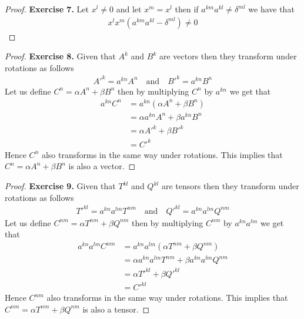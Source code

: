 \documentclass[11pt]{article}
\theoremstyle{definition}
\begin{document}
\begin{proof}{\textbf{Exercise 7.}}
    Let $x^l \neq 0$ and let $x^m = x^l$ then if $a^{km}a^{kl} \neq \delta^{ml}$
    we have that
    \begin{align*}
        x^lx^m(a^{km}a^{kl} - \delta^{ml}) \neq 0
    \end{align*}
\end{proof}
\begin{proof}{\textbf{Exercise 8.}}
    Given that $A^k$ and $B^k$ are vectors then they transform under rotations
    as follows
    \begin{align*}
        A'^k = a^{kn} A^n \quad\text{and}\quad B'^k = a^{kn} B^n
    \end{align*}
    Let us define $C^n = \alpha A^n + \beta B^n $
    then by multiplying $C^n$ by $a^{kn}$ we get that
    \begin{align*}
        a^{kn}C^n &= a^{kn}(\alpha A^n + \beta B^n)\\
            &= \alpha a^{kn} A^n + \beta a^{kn}B^n\\
            &= \alpha A'^k + \beta B'^k\\
            &= C'^k
    \end{align*}
    Hence $C^n$ also transforms in the same way under rotations.
    This implies that $C^n = \alpha A^n + \beta B^n$ is also a vector.
\end{proof}
\begin{proof}{\textbf{Exercise 9.}}
    Given that $T^{kl}$ and $Q^{kl}$ are tensors then they transform under
    rotations as follows
    \begin{align*}
        T'^{kl} = a^{kn}a^{lm} T^{nm} \quad\text{and}\quad
        Q'^{kl} = a^{kn}a^{lm} Q^{nm}
    \end{align*}
    Let us define $C^{nm} = \alpha T^{nm} + \beta Q^{nm} $
    then by multiplying $C^{nm}$ by $a^{kn}a^{lm}$ we get that
    \begin{align*}
        a^{kn}a^{lm}C^{nm} &= a^{kn}a^{lm}(\alpha T^{nm} + \beta Q^{nm})\\
            &= \alpha a^{kn}a^{lm} T^{nm} + \beta a^{kn}a^{lm}Q^{nm}\\
            &= \alpha T'^{kl} + \beta Q'^{kl}\\
            &= C'^{kl}
    \end{align*}
    Hence $C^{nm}$ also transforms in the same way under rotations.
    This implies that $C^{nm} = \alpha T^{nm} + \beta Q^{nm}$ is also a tensor.
\end{proof}
\end{document}
